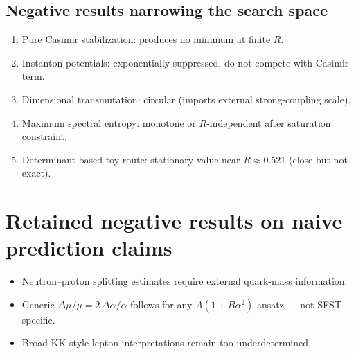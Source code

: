 \documentclass[11pt,a4paper]{article}
\begin{document}
\subsection{Negative results narrowing the search space}
\begin{enumerate}[leftmargin=1.5em]
\item Pure Casimir stabilization: produces no minimum at finite $R$.
\item Instanton potentials: exponentially suppressed, do not compete with Casimir term.
\item Dimensional transmutation: circular (imports external strong-coupling scale).
\item Maximum spectral entropy: monotone or $R$-independent after saturation constraint.
\item Determinant-based toy route: stationary value near $R\approx0.521$ (close but
  not exact).
\end{enumerate}

\section{Retained negative results on naive prediction claims}
\begin{itemize}[leftmargin=1.5em]
\item Neutron--proton splitting estimates require external quark-mass information.
\item Generic $\Delta\mu/\mu=2\,\Delta\alpha/\alpha$ follows for any $A(1+B\alpha^2)$
  ansatz --- not SFST-specific.
\item Broad KK-style lepton interpretations remain too underdetermined.
\end{itemize}

\end{document}
